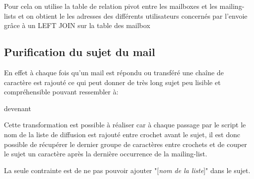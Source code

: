 Pour cela on utilise la table de relation pivot entre les mailboxes et les mailing-lists et on obtient le les adresses des différents utilisateurs concernés par l'envoie grâce à un LEFT JOIN sur la table des mailbox

\subsection*{Purification du sujet du mail}

En effet à chaque fois qu'un mail est répondu ou transféré une chaîne de caractère est rajouté ce qui peut donner de très long sujet peu lisible et compréhensible pouvant ressembler à:

 devenant 

Cette transformation est possible à réaliser car à chaque passage par le script le nom de la liste de diffusion est rajouté entre crochet avant le sujet, il est donc possible de récupérer le dernier groupe de caractères entre crochets et de couper le sujet un caractère après la dernière occurrence de la mailing-list.

La seule contrainte est de ne pas pouvoir ajouter "[\textit{nom de la liste}]" dans le sujet.
